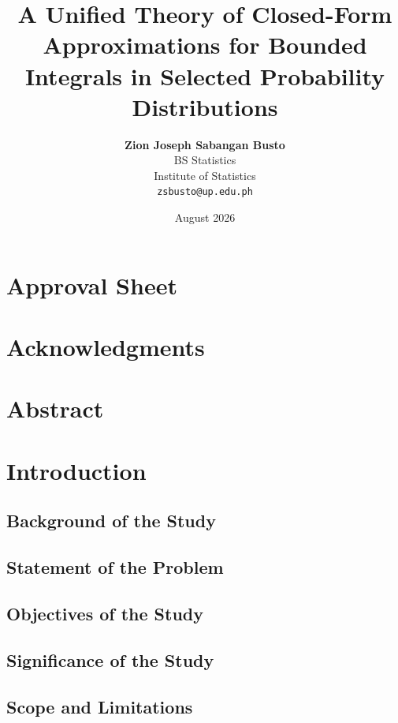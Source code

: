 \documentclass[11pt]{report}
\title{\vspace{-2.5cm}\textbf{A Unified Theory of Closed-Form Approximations for Bounded Integrals in Selected Probability Distributions}}
\author{
    \textbf{Zion Joseph Sabangan Busto}\\
    \vspace{-0.4cm}
    BS Statistics \\
    Institute of Statistics \\
    \texttt{zsbusto@up.edu.ph}

}
\date{August 2026}
\begin{document}
\maketitle
{}
\chapter*{Approval Sheet}

\chapter*{Acknowledgments}

\chapter*{Abstract}


\tableofcontents
\listoftables
\listoffigures



\newpage

\chapter{Introduction}

\section{Background of the Study}

\section{Statement of the Problem}

\section{Objectives of the Study}

\section{Significance of the Study}

\section{Scope and Limitations}
\end{document}
